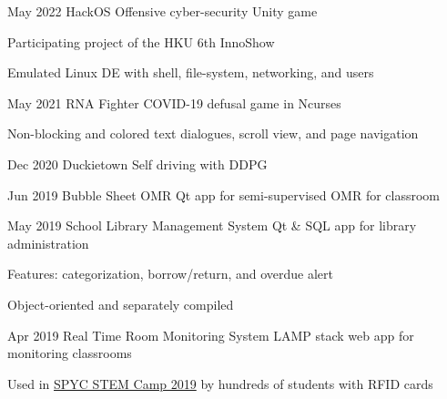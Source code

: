\hypertarget{HackOS}{
\projectEntry
{May 2022}
{HackOS}
{Offensive cyber-security Unity game}
{
\begin{descitemize}
    \specialitem Participating project of the HKU 6th InnoShow
    \item Emulated Linux DE with shell, file-system, networking, and users
\end{descitemize}
}
}

\projectEntry
{May 2021}
{RNA Fighter}
{COVID-19 defusal game in Ncurses}
{
\begin{descitemize}
	\item Non-blocking and colored text dialogues, scroll view, and page navigation
\end{descitemize}
}

\projectEntry
{Dec 2020}
{Duckietown}
{Self driving with DDPG}
{}

\projectEntry
{Jun 2019}
{Bubble Sheet OMR}
{Qt app for semi-supervised OMR for classroom}
{}

\projectEntry
{May 2019}
{School Library Management System}
{Qt \& SQL app for library administration}
{
\begin{descitemize}
    \item Features: categorization, borrow/return, and overdue alert
    \item Object-oriented and separately compiled
\end{descitemize}
}

\hypertarget{RTRMS}{
\projectEntry
{Apr 2019}
{Real Time Room Monitoring System}
{LAMP stack web app for monitoring classrooms}
{
\begin{descitemize}
    \item Used in \hyperlink{STEM_Camp_2019}{SPYC STEM Camp 2019} by hundreds of students with RFID cards
\end{descitemize}
}
}

